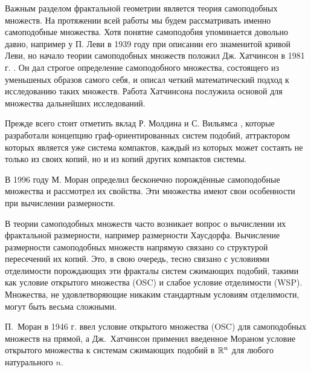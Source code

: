Важным разделом фрактальной геометрии является теория самоподобных множеств.
На протяжении всей работы мы будем рассматривать именно самоподобные множества.
Хотя понятие самоподобия упоминается довольно давно, например у П. Леви в 1939 году \cite{Levy1939} при описании его знаменитой кривой Леви, но начало теории самоподобных множеств положил Дж. Хатчинсон в 1981 г. \cite{Hut1981}.
Он дал строгое определение самоподобного множества, состоящего из уменьшеных образов самого себя, и описал четкий математический подход к исследованию таких множеств. 
Работа Хатчинсона послужила основой для множества дальнейших исследований.

Прежде всего стоит отметить вклад Р. Молдина и С. Вильямса \cite{MW1988}, которые разработали концепцию граф-ориентированных систем подобий, аттрактором которых является уже система компактов, каждый из которых может состаять не только из своих копий, но и из копий других компактов системы.

В 1996 году М. Моран \cite{Moran1996} определил бесконечно порождённые самоподобные множества и рассмотрел их свойства.
Эти множества имеют свои особенности при вычислении размерности.

В теории самоподобных множеств часто возникает вопрос о вычислении их фрактальной размерности, например размерности Хаусдорфа.
Вычисление размерности самоподобных множеств напрямую связано со структурой пересечений их копий.
Это, в свою очередь, тесно связано с условиями отделимости порождающих эти фракталы систем сжимающих подобий, такими как условие открытого множества (OSC) и слабое условие отделимости (WSP).
Множества, не удовлетворяющие никаким стандартным условиям отделимости, могут быть весьма сложными.


П.~Моран в 1946 г. \cite{Moran1946} ввел условие открытого множества (OSC) для самоподобных множеств на прямой, а Дж.~Хатчинсон \cite{Hut1981} применил введенное Мораном условие открытого множества к системам сжимающих подобий в $\mathbb{R}^n$ для любого натурального $n$.

